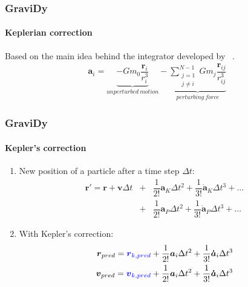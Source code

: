 \begin{frame}[fragile]
    \frametitle{GraviDy}
    \framesubtitle{Keplerian correction}
    Based on the main idea behind the integrator developed by ~\cite{2006IAUJD...6E..24L}.
    \begin{eqnarray}
        \boldsymbol{a}_{i} =   \underbrace{ - G m_{0}
                                          \dfrac{\boldsymbol{r}_{i}}{r_{i}^{3}}
                                          }_{unperturbed\ motion}
                             - \underbrace{ \sum\limits_{\substack{j=1\\j\neq i}}^{N-1}
                                            G m_{j} \dfrac{\boldsymbol{r}_{ij}}{r_{ij}^{3}}
                                          }_{perturbing\ force}
    \end{eqnarray}
\end{frame}

\begin{frame}
    \frametitle{GraviDy}
    \framesubtitle{Kepler's correction}
    \begin{enumerate}
        \item New position of a particle after a time step $\Delta t$:
        \begin{eqnarray}
            \boldsymbol{r'} =    \boldsymbol{      r}              +
                                       \boldsymbol{      v} \Delta t     &+&
                         \dfrac{1}{2!} \boldsymbol{      a}_{K} \Delta t^{2} +
                         \dfrac{1}{3!} \boldsymbol{\dot{a}}_{K} \Delta t^{3} + \ldots \nonumber\\
                          &+& 
                         \dfrac{1}{2!} \boldsymbol{      a}_{P} \Delta t^{2} +
                         \dfrac{1}{3!} \boldsymbol{\dot{a}}_{P} \Delta t^{3} + \ldots
        \end{eqnarray}
        \item With Kepler's correction:
        \begin{eqnarray}
            \boldsymbol{r}_{pred} =    \textcolor{blue}{\boldsymbol{      r}_{k,pred}}         +
                         \dfrac{1}{2!}       \boldsymbol{      a}_{i} \Delta t^{2} +
                         \dfrac{1}{3!}       \boldsymbol{\dot{a}}_{i} \Delta t^{3} \\
            \boldsymbol{v}_{pred} =    \textcolor{blue}{\boldsymbol{      v}_{k,pred}}         +
                         \dfrac{1}{2!}       \boldsymbol{      a}_{i} \Delta t^{2} +
                         \dfrac{1}{3!}       \boldsymbol{\dot{a}}_{i} \Delta t^{3}
        \end{eqnarray}

    \end{enumerate}
\end{frame}


